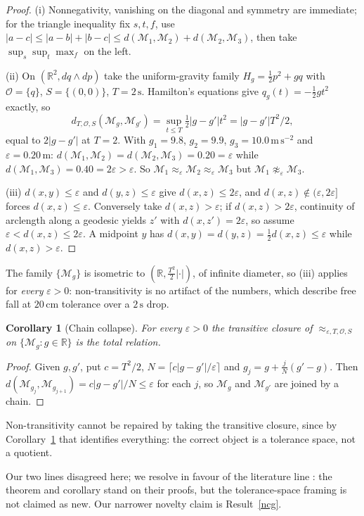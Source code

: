 \documentclass[12pt,a4paper]{article}
\theoremstyle{definition}
\theoremstyle{plain}
\newtheorem{corollary}[definition]{Corollary}
\theoremstyle{commentary}
\newcommand{\R}{\mathbb{R}}
\newcommand{\Oc}{\mathcal{O}}
\newcommand{\Mc}{\mathcal{M}}
\newcommand{\eps}{\varepsilon}
\begin{document}
\begin{proof}
(i) Nonnegativity, vanishing on the diagonal and symmetry are immediate; for the triangle inequality fix $s,t,f$, use $|a-c|\le|a-b|+|b-c|\le d(\Mc_1,\Mc_2)+d(\Mc_2,\Mc_3)$, then take $\sup_s\sup_t\max_f$ on the left.

(ii) On $(\R^2,dq\wedge dp)$ take the uniform-gravity family $H_g=\tfrac12p^2+gq$ with $\Oc=\{q\}$, $S=\{(0,0)\}$, $T=2\,\mathrm{s}$. Hamilton's equations give $q_g(t)=-\tfrac12gt^2$ exactly, so
\[d_{T,\Oc,S}(\Mc_g,\Mc_{g'})=\sup_{t\le T}\tfrac12|g-g'|t^2=|g-g'|T^2/2,\]
equal to $2|g-g'|$ at $T=2$. With $g_1=9.8$, $g_2=9.9$, $g_3=10.0\,\mathrm{m\,s^{-2}}$ and $\eps=0.20\,\mathrm{m}$: $d(\Mc_1,\Mc_2)=d(\Mc_2,\Mc_3)=0.20=\eps$ while $d(\Mc_1,\Mc_3)=0.40=2\eps>\eps$. So $\Mc_1\approx_\eps\Mc_2\approx_\eps\Mc_3$ but $\Mc_1\not\approx_\eps\Mc_3$.

(iii) $d(x,y)\le\eps$ and $d(y,z)\le\eps$ give $d(x,z)\le2\eps$, and $d(x,z)\notin(\eps,2\eps]$ forces $d(x,z)\le\eps$. Conversely take $d(x,z)>\eps$; if $d(x,z)>2\eps$, continuity of arclength along a geodesic yields $z'$ with $d(x,z')=2\eps$, so assume $\eps<d(x,z)\le2\eps$. A midpoint $y$ has $d(x,y)=d(y,z)=\tfrac12d(x,z)\le\eps$ while $d(x,z)>\eps$.
\end{proof}

The family $\{\Mc_g\}$ is isometric to $(\R,\tfrac{T^2}{2}|\cdot|)$, of infinite diameter, so (iii) applies for \emph{every} $\eps>0$: non-transitivity is no artifact of the numbers, which describe free fall at $20\,\mathrm{cm}$ tolerance over a $2\,\mathrm{s}$ drop.

\begin{corollary}[Chain collapse]
\label{chain}
For every $\eps>0$ the transitive closure of $\approx_{\eps,T,\Oc,S}$ on $\{\Mc_g:g\in\R\}$ is the total relation.
\end{corollary}

\begin{proof}
Given $g,g'$, put $c=T^2/2$, $N=\lceil c|g-g'|/\eps\rceil$ and $g_j=g+\tfrac{j}{N}(g'-g)$. Then $d(\Mc_{g_j},\Mc_{g_{j+1}})=c|g-g'|/N\le\eps$ for each $j$, so $\Mc_g$ and $\Mc_{g'}$ are joined by a chain.
\end{proof}

Non-transitivity cannot be repaired by taking the transitive closure, since by Corollary~\ref{chain} that identifies everything: the correct object is a tolerance space, not a quotient.

Our two lines disagreed here; we resolve in favour of the literature line \cite{LaudanLeplin1991}: the theorem and corollary stand on their proofs, but the tolerance-space framing is not claimed as new. Our narrower novelty claim is Result~\ref{ncg}.
\end{document}
